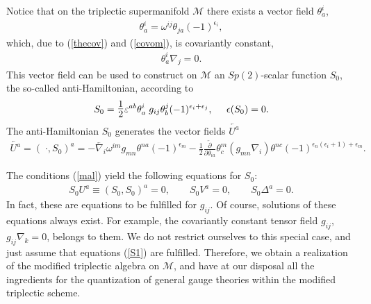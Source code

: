 \documentclass[a4paper,11pt]{article}
\begin{document}
Notice that on the triplectic supermanifold $\mathcal{M}$ there
exists a vector field $\theta _{a}^{i}$,
\begin{eqnarray}
\label{vom} \theta^i_a=\omega^{ij}\theta_{ja}(-1)^{\epsilon_i},
\end{eqnarray}
which, due to (\ref{thecov}) and (\ref{covom}), is covariantly constant,
\begin{eqnarray}
\label{covthe} \theta^i_a\nabla_j=0.
\end{eqnarray}
This vector field can be used to construct on $\mathcal{M}$ an 
$Sp(2)$-scalar function
$S_{0}$, the so-called anti-Hamiltonian, according to
\begin{eqnarray}
\label{S0}
 S_0=\hbox{\Large$\frac{1}{2}$}\varepsilon^{ab}\theta^i_a\;g_{ij}\theta^j_b
(-1)^{\epsilon_i+\epsilon_j}, \;\;\;\;\; \epsilon(S_0)=0.
\end{eqnarray}
%
The anti-Hamiltonian $S_0$ generates the vector fields
$\overleftarrow{U^a}$
\begin{eqnarray}
\label{Ua1} \overleftarrow{U^a}=(\;\cdot,S_0)^a =
-\overleftarrow{\nabla_i}\omega^{im}g_{mn}\theta^{na}(-1)^{\epsilon_m}-
\frac 12
\frac{\overleftarrow{\partial}}{\partial\theta_{ia}}\theta^m_c
(g_{mn}\nabla_i)\theta^{nc}(-1)^{\epsilon_n(\epsilon_i+1)+\epsilon_m}.
\end{eqnarray}

The conditions (\ref{mal}) yield the following equations for
$S_{0}$:
\begin{eqnarray}
S_0 U^a \equiv (S_0,S_0)^a=0, \qquad S_0V^a=0,\qquad S_0\Delta^a
=0. \label{S1}
\end{eqnarray}
In fact, these are equations to be fulfilled for $g_{ij}$. Of
course, solutions of these equations always exist. For example,
the covariantly constant tensor field $g_{ij}$, $g_{ij}\nabla
_{k}=0$, belongs to them. We do not restrict ourselves to this
special case, and just assume that equations (\ref{S1}) are
fulfilled. Therefore, we obtain a realization of the modified
triplectic algebra on $\mathcal{M}$, and have at our disposal all
the ingredients for the quantization of general gauge theories
within the modified triplectic scheme.
\end{document}
